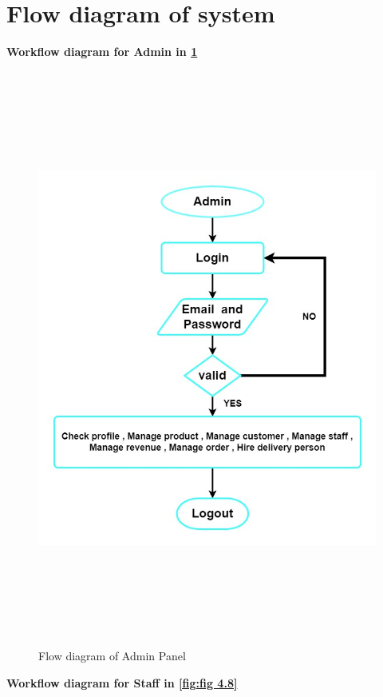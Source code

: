 \section{Flow diagram of system}

\textbf{Workflow diagram for Admin in \ref{fig:fig 4.7}}\\

\begin{figure}[ht]
    \centering  
    \includegraphics[width=\textwidth,height=19cm]{update_diagram/admin flow diagram.jpg}    
    \caption{Flow diagram of Admin Panel}
    \label{fig:fig 4.7}
\end{figure}
\newpage
\textbf{Workflow diagram for Staff in \ref{fig:fig 4.8}}\\


